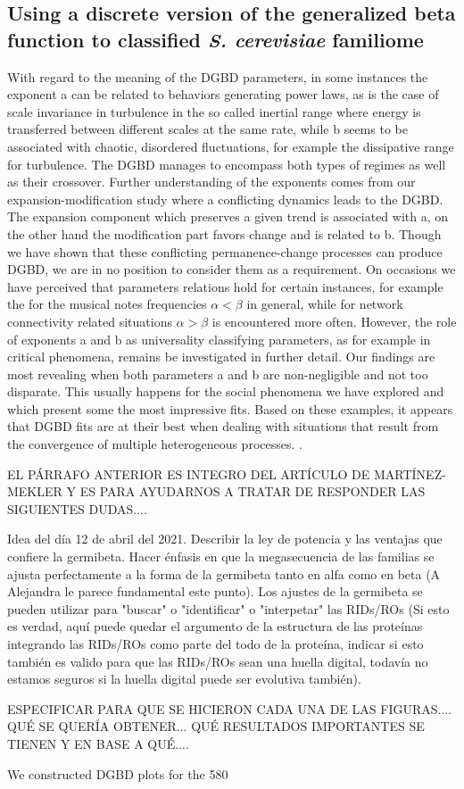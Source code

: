 \documentclass[preprint,12pt]{elsarticle}
\begin{document}
\bigbreak



\subsection{Using a discrete version of the generalized beta function to classified {\it S. cerevisiae} familiome}
With regard to the meaning of the DGBD parameters, in some instances the exponent a can be related to behaviors generating power laws, as is the case of scale invariance in turbulence in the so called inertial range where energy is transferred between different scales at the same rate, while b seems to be associated with chaotic, disordered fluctuations, for example the dissipative range for turbulence. The DGBD manages to encompass both types of regimes as well as their crossover. Further understanding of the exponents comes from our expansion-modification study where a conflicting dynamics leads to the DGBD. The expansion component which preserves a given trend is associated with a, on the other hand the modification part favors change and is related to b. Though we have shown that these conflicting permanence-change processes can produce DGBD, we are in no position to consider them as a requirement. On occasions we have perceived that parameters relations hold for certain instances, for example the for the musical notes frequencies $\alpha < \beta$ in general, while for network connectivity related situations $\alpha > \beta $ is encountered more often. However, the role of exponents a and b as universality classifying parameters, as for example in critical phenomena, remains be investigated in further detail. Our findings are most revealing when both parameters a and b are non-negligible and not too disparate. This usually happens for the social phenomena we have explored and which present some the most impressive fits. Based on these examples, it appears that DGBD fits are at their best when dealing with situations that result from the convergence of multiple heterogeneous processes. \cite{martinez2009universality}. \par EL PÁRRAFO ANTERIOR ES INTEGRO DEL ARTÍCULO DE MARTÍNEZ-MEKLER Y ES PARA AYUDARNOS A TRATAR DE RESPONDER LAS SIGUIENTES DUDAS.... \par Idea del día 12 de abril del 2021. Describir la ley de potencia y las ventajas que confiere la germibeta. Hacer énfasis en que la megasecuencia de las familias se ajusta perfectamente a la forma de la germibeta tanto en alfa como en beta (A Alejandra le parece fundamental este punto). Los ajustes de la germibeta se pueden utilizar para "buscar" o "identificar" o "interpetar" las RIDs/ROs (Si esto es verdad, aquí puede quedar el argumento de la estructura de las proteínas integrando las RIDs/ROs como parte del todo de la proteína, indicar si esto también es valido para que las RIDs/ROs sean una huella digital, todavía no estamos seguros si la huella digital puede ser evolutiva también).  \par ESPECIFICAR PARA QUE SE HICIERON CADA UNA DE LAS FIGURAS.... QUÉ SE QUERÍA OBTENER... QUÉ RESULTADOS IMPORTANTES SE TIENEN Y EN BASE A QUÉ.... \par  We constructed DGBD plots for the 580  
\end{document}
